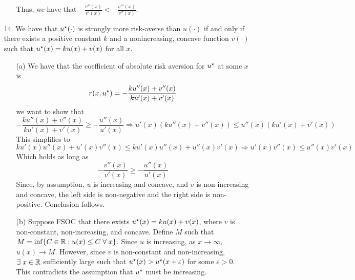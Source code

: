 \documentclass[12pt]{article}
\begin{document}
\begin{itemize}
\begin{itemize}
\[		\]
		Thus, we have that $-\frac{v''(x)}{v'(x)} < - \frac{v'''(x)}{v''(x)}$.
	\end{itemize}
	\item[14.] We have that $u^\star(\cdot)$ is strongly more risk-averse than $u(\cdot)$ if and only if there exists a positive constant $k$ and a nonincreasing, concave function $v(\cdot)$ such that $u^\star(x) = ku(x) + v(x)$ for all $x$.
	\begin{itemize}
		\item[(a)] We have that the coefficient of absolute risk aversion for $u^\star$ at some $x$ is
		\[
		r(x,u^\star) = - \frac{ku''(x) + v''(x)}{ku'(x) + v'(x)}
		\] 
		we want to show that
		\[
		- \frac{ku''(x) + v''(x)}{ku'(x) + v'(x)} \ge -\frac{u''(x)}{u'(x)} \Longrightarrow u'(x)(ku''(x)+v''(x)) \le u''(x)(ku'(x) + v'(x))
		\]
		This simplifies to
		\[
		ku'(x)u''(x) + u'(x)v''(x) \le ku'(x)u''(x) + u''(x)v'(x) \Longrightarrow  u'(x)v''(x) \le u''(x)v'(x)
		\]
		Which holds as long as
		\[
		-\frac{v''(x)}{v'(x)} \ge -\frac{u''(x)}{u'(x)}
		\]
		Since, by assumption, $u$ is increasing and concave, and $v$ is non-increasing and concave, the left side is non-negative and the right side is non-positive. Conclusion follows.
		
		\item[(b)] Suppose FSOC that there exists $u^\star(x) = ku(x) + v(x)$, where $v$ is non-constant, non-increasing, and concave. Define $M$ such that $M = \inf \{C \in \reals : u(x) \le C \forall x\}$. Since $u$ is increasing, as $x \to \infty$, $u(x) \to M$. However, since $v$ is non-constant and non-increasing, $\exists x \in \reals$ sufficiently large such that $u^\star(x) > u^\star(x + \varepsilon)$ for some $\varepsilon > 0$. This contradicts the assumption that $u^\star$ must be increasing.
		

\end{itemize}
\end{itemize}
\end{document}
